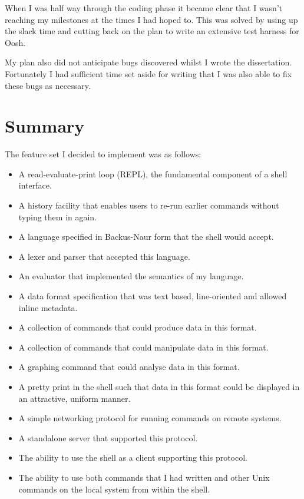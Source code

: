 \documentclass[12pt,twoside,notitlepage]{report}
\begin{document}
When I was half way through the coding phase it became clear that I
wasn't reaching my milestones at the times I had hoped to. This was
solved by using up the slack time and cutting back on the plan to
write an extensive test harness for Oosh.

My plan also did not anticipate bugs discovered whilst I wrote the
dissertation. Fortunately I had sufficient time set aside for writing
that I was also able to fix these bugs as necessary.

\section{Summary}

The feature set I decided to implement was as follows:

\begin{itemize}
\item A read-evaluate-print loop (REPL), the fundamental component of
  a shell interface.
\item A history facility that enables users to re-run earlier commands
  without typing them in again.
\item A language specified in Backus-Naur form that the shell would
  accept.
\item A lexer and parser that accepted this language.
\item An evaluator that implemented the semantics of my language.
\item A data format specification that was text based, line-oriented
  and allowed inline metadata.
\item A collection of commands that could produce data in this format.
\item A collection of commands that could manipulate data in this
  format.
\item A graphing command that could analyse data in this format.
\item A pretty print in the shell such that data in this format could
  be displayed in an attractive, uniform manner.
\item A simple networking protocol for running commands on remote
  systems.
\item A standalone server that supported this protocol.
\item The ability to use the shell as a client supporting this
  protocol.
\item The ability to use both commands that I had written and other
  Unix commands on the local system from within the shell.
\end{itemize}
\end{document}
